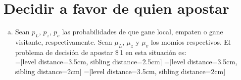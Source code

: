  \section{Decidir a favor de quien apostar}
\label{apostar-a-quien}
 \begin{enumerate}[(a)]
  \item Sean $p_L$, $p_z$, $p_v$ las probabilidades de que gane local, empaten o gane visitante, respectivamente. Sean $\mu_L$, $\mu_z$ y $\mu_v$ los momios respectivos. El problema de decisión de apostar \$\,1 en esta situación es:\\
 
 =[level distance=3.5cm, sibling distance=2.5cm]
 =[level distance=3.5cm, sibling distance=2cm]
 =[level distance=3.5cm, sibling distance=2cm]



\end{enumerate}
